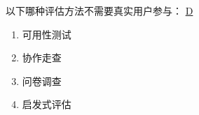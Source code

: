 \begin{problem}
	以下哪种评估方法不需要真实用户参与：
	\uline{D}    
    \vspace{-0.8em}
    \begin{multicols}{4}
        \begin{enumerate}[label=\Alph*.]
            \item 可用性测试
            \item 协作走查
            \item 问卷调查
            \item 启发式评估
        \end{enumerate}
    \end{multicols}
    \vspace{-1em}
\end{problem}
